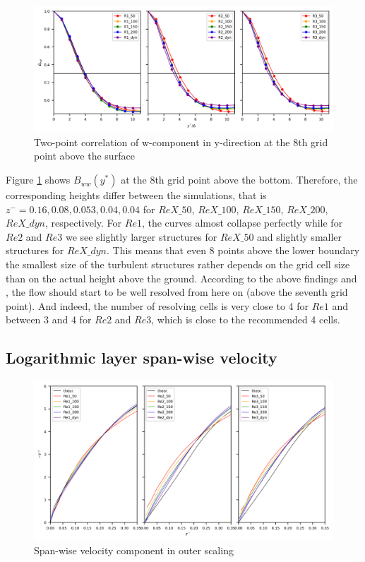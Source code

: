 \documentclass[a4paper,11pt]{article}
\begin{document}
\begin{figure}[ht]
  \centerline{
	\includegraphics[width=\textwidth]{figures_2024/d3y_2pc_ww_3Re_4.png}
}
  \caption{Two-point correlation of w-component in y-direction at the 8th grid point above the surface}
  \label{2pc_4}
\end{figure}

Figure \ref{2pc_4} shows $B_{ww}(y^*)$ at the 8th grid point above the bottom. Therefore, the corresponding heights differ between the simulations, that is $z^-=0.16, 0.08, 0.053, 0.04, 0.04$ for $ReX\_50$, $ReX\_100$, $ReX\_150$, $ReX\_200$, $ReX\_dyn$, respectively. For $Re1$, the curves almost collapse perfectly while for $Re2$ and $Re3$ we see slightly larger structures for $ReX\_50$ and slightly smaller structures for $ReX\_dyn$. This means that even 8 points above the lower boundary the smallest size of the turbulent structures rather depends on the grid cell size than on the actual height above the ground. According to the above findings and \cite{maronga2014monin}, the flow should start to be well resolved from here on (above the seventh grid point). And indeed, the number of resolving cells is very close to 4 for $Re1$ and between 3 and 4 for $Re2$ and $Re3$, which is close to the recommended 4 cells.

%
\subsection{Logarithmic layer span-wise velocity}

\begin{figure}[ht]
  \centerline{
	\includegraphics[width=\textwidth]{figures_2024/d3y_3Re_v_outer_lin.png}
}
  \caption{Span-wise velocity component in outer scaling}
  \label{3Re_v_lin}
\end{figure}
\end{document}
